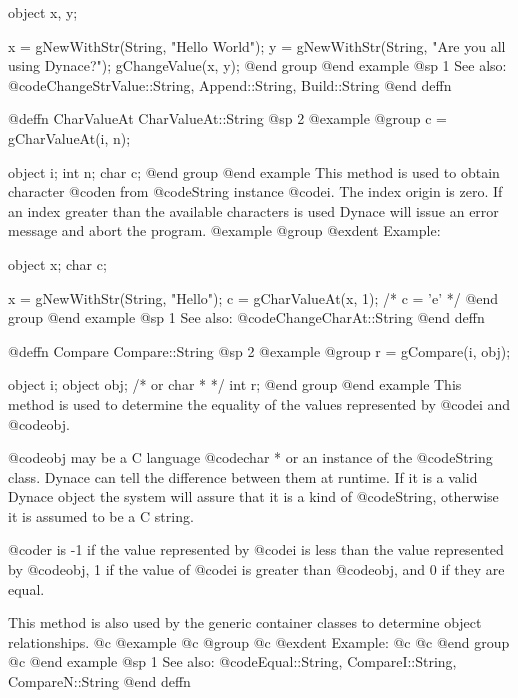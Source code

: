 object  x, y;

x = gNewWithStr(String, "Hello World");
y = gNewWithStr(String, "Are you all using Dynace?");
gChangeValue(x, y);
@end group
@end example
@sp 1
See also:  @code{ChangeStrValue::String, Append::String, Build::String}
@end deffn











@deffn {CharValueAt} CharValueAt::String
@sp 2
@example
@group
c = gCharValueAt(i, n);

object  i;
int     n;
char    c;
@end group
@end example
This method is used to obtain character @code{n} from @code{String} instance
@code{i}.  The index origin is zero.  If an index greater than the available
characters is used Dynace will issue an error message and abort the program.
@example
@group
@exdent Example:

object  x;
char    c;

x = gNewWithStr(String, "Hello");
c = gCharValueAt(x, 1);
/*  c = 'e'  */
@end group
@end example
@sp 1
See also:  @code{ChangeCharAt::String}
@end deffn









@deffn {Compare} Compare::String
@sp 2
@example
@group
r = gCompare(i, obj);

object  i;
object  obj;  /*  or char *  */
int     r;
@end group
@end example
This method is used to determine the equality of the values represented
by @code{i} and @code{obj}.

@code{obj} may be a C language @code{char *} or an instance of the
@code{String} class.  Dynace can tell the difference between them at
runtime.  If it is a valid Dynace object the system will assure that it is
a kind of @code{String}, otherwise it is assumed to be a C string.

@code{r} is -1 if the value represented by @code{i} is less than the
value represented by @code{obj}, 1 if the value of @code{i} is greater
than @code{obj}, and 0 if they are equal.

This method is also used by the generic container classes to determine
object relationships.
@c @example
@c @group
@c @exdent Example:
@c
@c @end group
@c @end example
@sp 1
See also:  @code{Equal::String, CompareI::String, CompareN::String}
@end deffn








